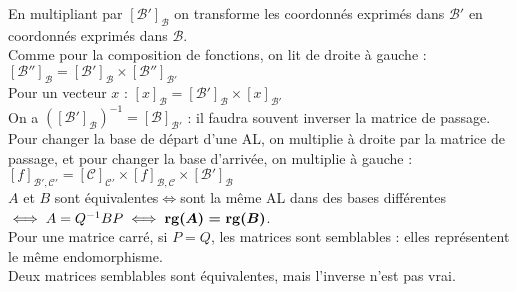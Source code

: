     En multipliant par $[\mathcal{B}']_\mathcal{B}$ on transforme les coordonnés exprimés dans $\mathcal{B}'$ en coordonnés exprimés dans $\mathcal{B}$.\\
    Comme pour la composition de fonctions, on lit de droite à gauche : $[\mathcal{B''}]_{\mathcal{B}} = [\mathcal{B'}]_{\mathcal{B}} \times [\mathcal{B}'']_{\mathcal{B}'}$\\
    Pour un vecteur $x$ : $[x]_{\mathcal{B}} = [\mathcal{B'}]_\mathcal{B} \times [x]_{\mathcal{B}'}$
    \vspace{5pt}\\
    On a $([\mathcal{B}']_\mathcal{B})^{-1} = [\mathcal{B}]_{\mathcal{B}'}$ : il faudra souvent inverser la matrice de passage.
    \vspace{5pt}\\
    Pour changer la base de départ d'une AL, on multiplie à droite par la matrice de passage, et pour changer la base d'arrivée, on multiplie à gauche : $[f]_{\mathcal{B}',\mathcal{C}'} = [\mathcal{C}]_{\mathcal{C'}} \times [f]_{\mathcal{B},\mathcal{C}} \times [\mathcal{B'}]_{\mathcal{B}}$\\

    $A$ et $B$ sont équivalentes$\iff$sont la même AL dans des bases différentes$\iff A = Q^{-1} B P \iff \boldsymbol{\operatorname{rg}(A) = \operatorname{rg}(B)}$.\\
    Pour une matrice carré, si $P = Q$, les matrices sont semblables : elles représentent le même endomorphisme.\\

    Deux matrices semblables sont équivalentes, mais l'inverse n'est pas vrai.

